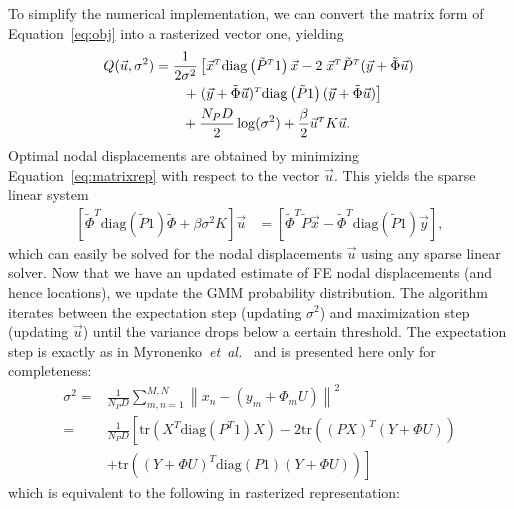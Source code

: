 \documentclass[journal]{IEEEtran}
\newcommand{\trans}[1]{#1^{\scriptscriptstyle T}}
\newcommand{\trace}{\mathrm{tr}}
\newcommand{\diag}{\mathrm{diag}}
\begin{document}
To simplify the numerical implementation, we can convert the matrix form of Equation~\eqref{eq:obj} into a rasterized vector one, yielding
\begin{align}\label{eq:matrixrep}
    Q(\vec{u},\sigma^2) & = \dfrac{1}{2\sigma^2}\left[ \trans{\vec{x}}\diag\left(\trans{\tilde{P}}1\right)\vec{x} -2\;\trans{\vec{x}}\trans{\tilde{P}}(\vec{y}+\tilde{\Phi}\vec{u}) \right.\notag\\
    & \qquad \left. +\;\trans{(\vec{y}+\tilde{\Phi}\vec{u})}\diag\left(\tilde{P}1\right)(\vec{y}+\tilde{\Phi}\vec{u}) \right]\notag\\
    & \qquad + \dfrac{N_PD}{2}\log(\sigma^2) + \dfrac{\beta}{2}\trans{\vec{u}}K\vec{u}.
\end{align}
Optimal nodal displacements are obtained by minimizing Equation~\eqref{eq:matrixrep} with respect to the vector $\vec{u}$. This yields the sparse linear system
\begin{align}\label{eq:Mstep}
        \left[\trans{\tilde{\Phi}}\diag\!\left(\tilde{P}1\right)\tilde{\Phi} 
            + \beta \sigma^2K\right] \vec{u} & = \left[\trans{\tilde{\Phi}}\tilde{P}\vec{x}
            -\trans{\tilde{\Phi}}\diag\!\left(\tilde{P}1\right)\vec{y}\right],
\end{align}
which can easily be solved for the nodal displacements $\vec{u}$ using any sparse linear solver.  Now that we have an updated estimate of FE nodal displacements (and hence locations), we update the GMM probability distribution.  The algorithm iterates between the expectation step (updating $\sigma^2$) and maximization step (updating $\vec{u}$) until the variance drops below a certain threshold.  The expectation step is exactly as in Myronenko~\textit{et~al.}~\cite{Myronenko10a} and is presented here only for completeness:
\begin{align}
\sigma^2 = & \frac{1}{N_PD}\sum_{m,n=1}^{M,N}\left\|x_n- (y_m+\Phi_mU)\right\|^2 \nonumber\\
= & \frac{1}{N_PD}\left[\trace\!\left(X^T\diag(P^T1)X\right)-2\trace\!\left((PX)^T(Y+{\Phi}U)\right)\right.\nonumber\\
& \left.+\trace\!\left((Y+{\Phi}U)^T\diag(P1)(Y+{\Phi}U)\right)\right] \label{eq:estep1}
\end{align}
which is equivalent to the following in rasterized representation:
\end{document}
